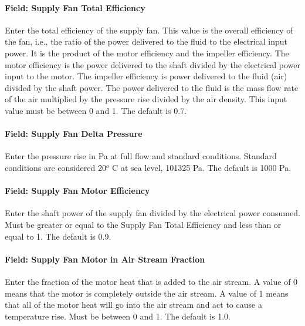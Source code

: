\paragraph{Field: Supply Fan Total Efficiency}\label{field-supply-fan-total-efficiency-9}

Enter the total efficiency of the supply fan. This value is the overall efficiency of the fan, i.e., the ratio of the power delivered to the fluid to the electrical input power. It is the product of the motor efficiency and the impeller efficiency. The motor efficiency is the power delivered to the shaft divided by the electrical power input to the motor. The impeller efficiency is power delivered to the fluid (air) divided by the shaft power. The power delivered to the fluid is the mass flow rate of the air multiplied by the pressure rise divided by the air density. This input value must be between 0 and 1. The default is 0.7.

\paragraph{Field: Supply Fan Delta Pressure}\label{field-supply-fan-delta-pressure-8}

Enter the pressure rise in Pa at full flow and standard conditions. Standard conditions are considered 20\(^{o}\) C at sea level, 101325 Pa. The default is 1000 Pa.

\paragraph{Field: Supply Fan Motor Efficiency}\label{field-supply-fan-motor-efficiency-9}

Enter the shaft power of the supply fan divided by the electrical power consumed. Must be greater or equal to the Supply Fan Total Efficiency and less than or equal to 1. The default is 0.9.

\paragraph{Field: Supply Fan Motor in Air Stream Fraction}\label{field-supply-fan-motor-in-air-stream-fraction-5}

Enter the fraction of the motor heat that is added to the air stream. A value of 0 means that the motor is completely outside the air stream. A value of 1 means that all of the motor heat will go into the air stream and act to cause a temperature rise. Must be between 0 and 1. The default is 1.0.

